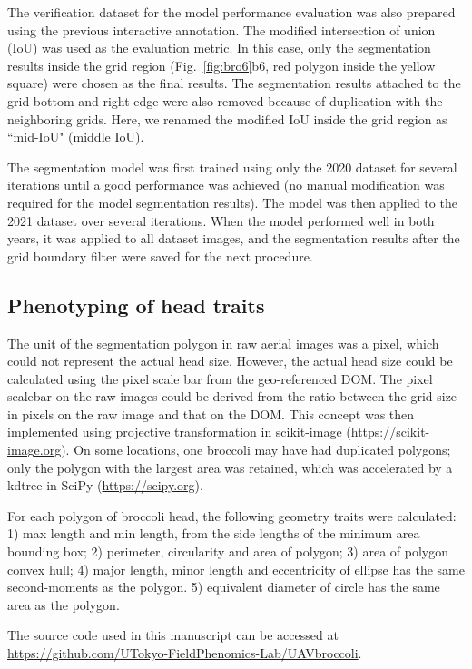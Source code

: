 The verification dataset for the model performance evaluation was also prepared using the previous interactive annotation. The modified intersection of union (IoU) was used as the evaluation metric. In this case, only the segmentation results inside the grid region (Fig.~\ref{fig:bro6}b6, red polygon inside the yellow square) were chosen as the final results. The segmentation results attached to the grid bottom and right edge were also removed because of duplication with the neighboring grids. Here, we renamed the modified IoU inside the grid region as ``mid-IoU" (middle IoU).

The segmentation model was first trained using only the 2020 dataset for several iterations until a good performance was achieved (no manual modification was required for the model segmentation results). The model was then applied to the 2021 dataset over several iterations. When the model performed well in both years, it was applied to all dataset images, and the segmentation results after the grid boundary filter were saved for the next procedure.

\subsection{Phenotyping of head traits}

The unit of the segmentation polygon in raw aerial images was a pixel, which could not represent the actual head size. However, the actual head size could be calculated using the pixel scale bar from the geo-referenced DOM. The pixel scalebar on the raw images could be derived from the ratio between the grid size in pixels on the raw image and that on the DOM. This concept was then implemented using projective transformation in scikit-image (\url{https://scikit-image.org}). On some locations, one broccoli may have had duplicated polygons; only the polygon with the largest area was retained, which was accelerated by a \gls{kdtree} in SciPy (\url{https://scipy.org}).

For each polygon of broccoli head, the following geometry traits were calculated: 1) max length and min length, from the side lengths of the minimum area bounding box; 2) perimeter, circularity and area of polygon; 3) area of polygon convex hull; 4) major length, minor length and eccentricity of ellipse has the same second-moments as the polygon. 5) equivalent diameter of circle has the same area as the polygon.

The source code used in this manuscript can be accessed at \url{https://github.com/UTokyo-FieldPhenomics-Lab/UAVbroccoli}. %

